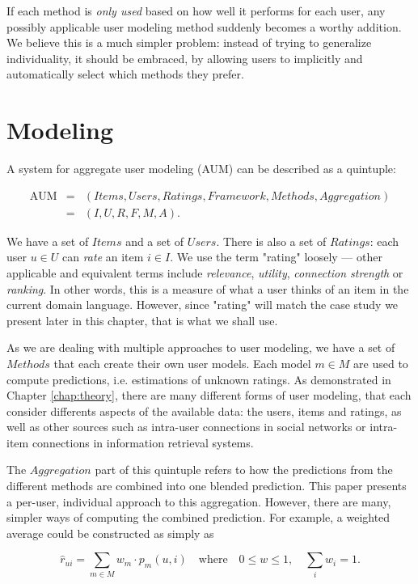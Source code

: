 If each method is \emph{only used} based on how well it performs for each user,
any possibly applicable user modeling method suddenly becomes a worthy addition.
We believe this is a much simpler problem: 
instead of trying to generalize individuality,
it should be embraced, by allowing users to implicitly and automatically select which methods they prefer.


\section{Modeling}

A system for aggregate user modeling (AUM) can be described as a quintuple:

\begin{eqnarray*}
  \mathrm{AUM} &=& (Items, Users, Ratings, Framework, Methods, Aggregation)\\
               &=& (I,U,R,F,M,A).
\end{eqnarray*}

We have a set of $Items$ and a set of $Users$.
There is also a set of $Ratings$: each user $u \in U$ can \emph{rate} an item $i \in I$.
We use the term "rating" loosely --- other applicable and equivalent terms include \emph{relevance}, \emph{utility},
\emph{connection strength} or \emph{ranking}. In other words, this is a measure of what a user thinks of an item
in the current domain language. However, since "rating" will match the case study we present later in this chapter,
that is what we shall use.

As we are dealing with multiple approaches to user modeling, we have a set of $Methods$ that each create their own
user models. Each model $m \in M$ are used to compute predictions, i.e. estimations of unknown ratings.
As demonstrated in Chapter \ref{chap:theory}, there are many different forms of user modeling,
that each consider differents aspects of the available data: the users, items and ratings, as well as 
other sources such as intra-user connections in social networks or intra-item connections in information retrieval systems.

The $Aggregation$ part of this quintuple refers to how the predictions from the different methods are combined
into one blended prediction. 
This paper presents a per-user, individual approach to this aggregation. However, there are many, simpler ways of computing the
combined prediction. For example, a weighted average could be constructed as simply as 

\begin{equation*}
  \hat{r}_{ui} = \sum_{m \in M} w_m \cdot p_m(u,i) 
  \quad \text{where}
  \quad 0 \leq w \leq 1, 
  \quad \sum_{i} w_i = 1.
\end{equation*}

